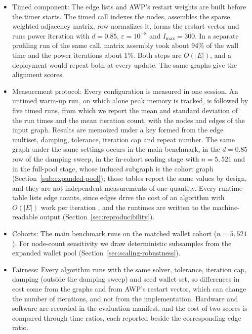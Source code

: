\begin{itemize}
\item Timed component: The edge lists and AWP's restart weights are built before the timer starts. The timed call indexes the nodes, assembles the sparse weighted adjacency matrix, row-normalizes it, forms the restart vector and runs power iteration with $d=0.85$, $\varepsilon=10^{-8}$ and $I_{\max}=300$. In a separate profiling run of the same call, matrix assembly took about 94\% of the wall time and the power iterations about 1\%. Both steps are $O(|E|)$, and a deployment would repeat both at every update. The same graphs give the alignment scores.

\item Measurement protocol: Every configuration is measured in one session. An untimed warm-up run, on which alone peak memory is tracked, is followed by five timed runs, from which we report the mean and standard deviation of the run times and the mean iteration count, with the nodes and edges of the input graph. Results are memoized under a key formed from the edge multiset, damping, tolerance, iteration cap and repeat number. The same graph under the same settings occurs in the main benchmark, in the $d=0.85$ row of the damping sweep, in the in-cohort scaling stage with $n=5{,}521$ and in the full-pool stage, whose induced subgraph is the cohort graph (Section~\ref{sub:expanded-pool}); those tables report the same values by design, and they are not independent measurements of one quantity. Every runtime table lists edge counts, since edges drive the cost of an algorithm with $O(|E|)$ work per iteration , and the runtimes are written to the machine-readable output (Section~\ref{sec:reproducibility}).

\item Cohorts: The main benchmark runs on the matched wallet cohort ($n=5{,}521$). For node-count sensitivity we draw deterministic subsamples from the expanded wallet pool (Section~\ref{sec:scaling-robustness}).

\item Fairness: Every algorithm runs with the same solver, tolerance, iteration cap, damping (outside the damping sweep) and seed wallet set, so differences in cost come from the graphs and from AWP's restart vector, which can change the number of iterations, and not from the implementation. Hardware and software are recorded in the evaluation manifest, and the cost of two scores is compared through time ratios, each reported beside the corresponding edge ratio.

\end{itemize}

